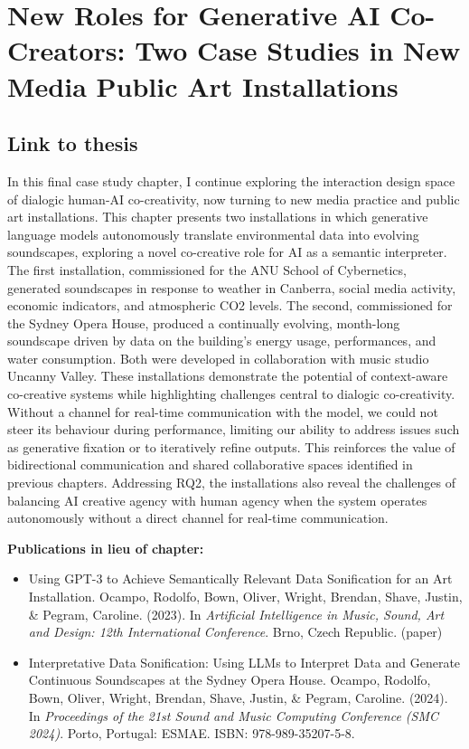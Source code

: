 \chapter{New Roles for Generative AI Co-Creators: Two Case Studies in New Media Public Art Installations}

\section{Link to thesis}

In this final case study chapter, I continue exploring the interaction design space of dialogic human-AI co-creativity, now turning to new media practice and public art installations. This chapter presents two installations in which generative language models autonomously translate environmental data into evolving soundscapes, exploring a novel co-creative role for AI as a semantic interpreter.
The first installation, commissioned for the ANU School of Cybernetics, generated soundscapes in response to weather in Canberra, social media activity, economic indicators, and atmospheric CO2 levels. The second, commissioned for the Sydney Opera House, produced a continually evolving, month-long soundscape driven by data on the building's energy usage, performances, and water consumption. Both were developed in collaboration with music studio Uncanny Valley.
These installations demonstrate the potential of context-aware co-creative systems while highlighting challenges central to dialogic co-creativity. Without a channel for real-time communication with the model, we could not steer its behaviour during performance, limiting our ability to address issues such as generative fixation or to iteratively refine outputs. This reinforces the value of bidirectional communication and shared collaborative spaces identified in previous chapters. Addressing RQ2, the installations also reveal the challenges of balancing AI creative agency with human agency when the system operates autonomously without a direct channel for real-time communication.

\textbf{Publications in lieu of chapter:}

\begin{itemize}
    \item Using GPT-3 to Achieve Semantically Relevant Data Sonification for an Art Installation. Ocampo, Rodolfo, Bown, Oliver, Wright, Brendan, Shave, Justin, \& Pegram, Caroline. (2023). In \textit{Artificial Intelligence in Music, Sound, Art and Design: 12th International Conference}. Brno, Czech Republic. (paper)
    \item Interpretative Data Sonification: Using LLMs to Interpret Data and Generate Continuous Soundscapes at the Sydney Opera House. Ocampo, Rodolfo, Bown, Oliver, Wright, Brendan, Shave, Justin, \& Pegram, Caroline. (2024). In \textit{Proceedings of the 21st Sound and Music Computing Conference (SMC 2024)}. Porto, Portugal: ESMAE. ISBN: 978-989-35207-5-8.
\end{itemize}








